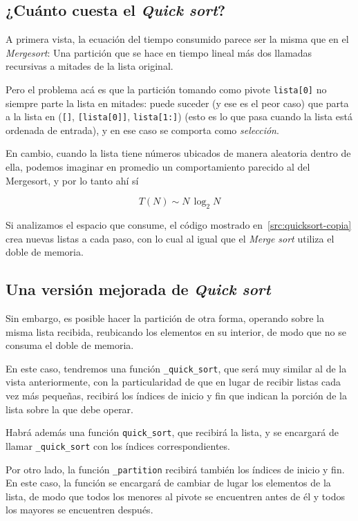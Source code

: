 \subsection{¿Cuánto cuesta el \emph{Quick sort}?}

A primera vista, la ecuación del tiempo consumido parece ser la misma que
en el \emph{Mergesort}: Una partición que se hace en tiempo lineal más dos
llamadas recursivas a mitades de la lista original.

Pero el problema acá es que la partición tomando como pivote
\lstinline!lista[0]! no siempre parte la lista en mitades: puede suceder (y
ese es el peor caso) que parta a la lista en (\lstinline![]!,
\lstinline![lista[0]]!, \lstinline!lista[1:]!) (esto es lo que pasa cuando
la lista está ordenada de entrada), y en ese
caso se comporta como \emph{selección}.

En cambio, cuando la lista tiene números ubicados de manera aleatoria
dentro de ella, podemos imaginar en promedio un comportamiento parecido al del
Mergesort, y por lo tanto ahí sí

$$T(N) \sim N \, \log_2 N$$

Si analizamos el espacio que consume, el código mostrado en~\ref{src:quicksort-copia}
crea nuevas listas a cada paso, con lo cual al
igual que el \emph{Merge sort} utiliza el doble de memoria.

\subsection{Una versión mejorada de \emph{Quick sort}}

Sin embargo, es posible hacer la partición de otra forma, operando sobre la
misma lista recibida, reubicando los elementos en su interior, de modo que
no se consuma el doble de memoria.

En este caso, tendremos una función \lstinline!_quick_sort!, que será muy
similar al de la vista anteriormente, con la particularidad de que en lugar
de recibir listas cada vez más pequeñas, recibirá los índices de inicio y
fin que indican la porción de la lista sobre la que debe operar.

Habrá además una función \lstinline!quick_sort!, que recibirá la lista,
y se encargará de llamar \lstinline!_quick_sort! con los
índices correspondientes.

Por otro lado, la función \lstinline!_partition! recibirá también los
índices de inicio y fin.  En este caso, la función se encargará de cambiar
de lugar los elementos de la lista, de modo que todos los menores al pivote
se encuentren antes de él y todos los mayores se encuentren después.

